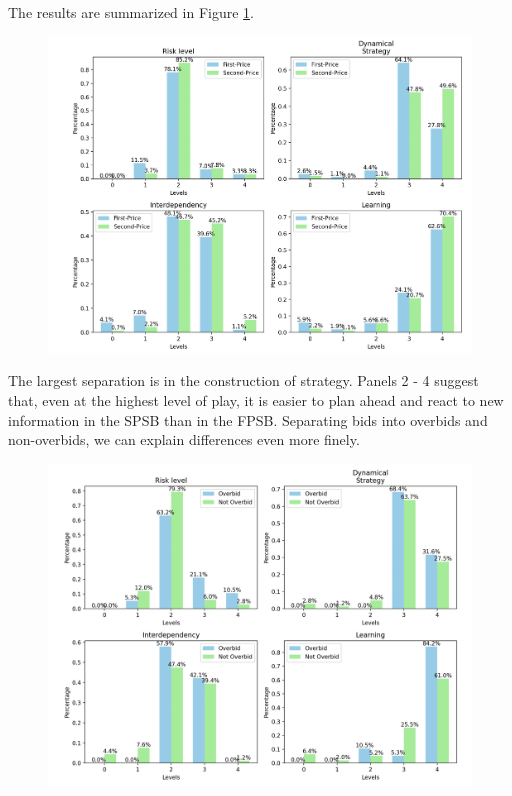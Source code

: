 \documentclass{article} %
\begin{document}
The results are summarized in Figure \ref{fig:SemanticSummary}.   

\begin{figure}[h]
    \centering \includegraphics[width=0.8\linewidth]{Figs/FP_SB_semantic.png}
    \caption{ }
    \label{fig:SemanticSummary}
\end{figure}

The largest separation is in the construction of strategy. Panels 2 - 4 suggest that, even at the highest level of play, it is easier to plan ahead and react to new information in the SPSB than in the FPSB. Separating bids into overbids and non-overbids, we can explain differences even more finely.

\begin{figure}[h!]
    \centering \includegraphics[width=0.8\linewidth]{Figs/FP_semantic.png}
    \caption{}
    \label{fig:FP_sem}
\end{figure}
\end{document}
